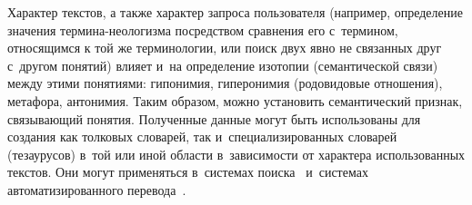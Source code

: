 \begin{multicols}{2}
    Характер текстов, а также характер запроса пользователя (например, 
определение значения тер\-ми\-на-нео\-ло\-гиз\-ма посредством сравнения его 
с~термином, относящимся к той же терминологии, или поиск двух явно не 
связанных друг с~другом понятий) влияет и~на определение изотопии 
(семантической связи) между этими понятиями: гипонимия, гиперонимия 
(родовидовые отношения), метафора, антонимия. Таким образом, можно 
установить семантический признак, свя\-зы\-ва\-ющий понятия. Полученные 
данные могут быть использованы для создания как толковых словарей, так 
и~специализированных словарей (тезаурусов) в~той или иной об\-ласти 
в~зависимости от характера использованных текс\-тов. Они могут применяться 
в~сис\-те\-мах поиска~\cite{12-an, 13-an} и~сис\-те\-мах автоматизированного 
перевода~\cite{14-an, 15-an}.
    

\end{multicols}

